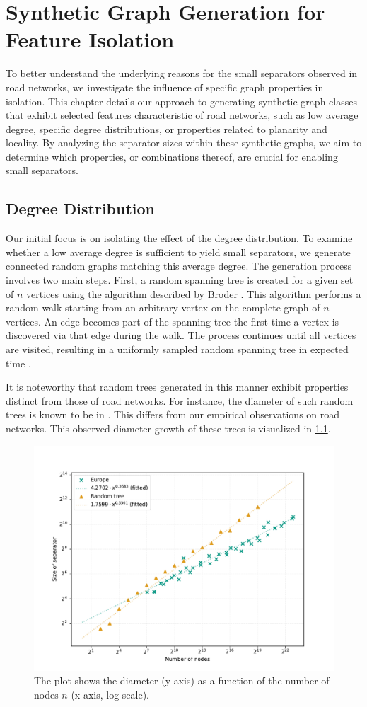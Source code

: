 \chapter{Synthetic Graph Generation for Feature Isolation}

To better understand the underlying reasons for the small separators observed in road networks, we investigate the influence of specific graph properties in isolation.
This chapter details our approach to generating synthetic graph classes that exhibit selected features characteristic of road networks, such as low average degree, specific degree distributions, or properties related to planarity and locality.
By analyzing the separator sizes within these synthetic graphs, we aim to determine which properties, or combinations thereof, are crucial for enabling small separators.

\section{Degree Distribution}

Our initial focus is on isolating the effect of the degree distribution.
To examine whether a low average degree is sufficient to yield small separators, we generate connected random graphs matching this average degree.
The generation process involves two main steps.
First, a random spanning tree is created for a given set of \(n\) vertices using the algorithm described by Broder \cite{broder_generating_1989}.
This algorithm performs a random walk starting from an arbitrary vertex on the complete graph of \(n\) vertices.
An edge becomes part of the spanning tree the first time a vertex is discovered via that edge during the walk.
The process continues until all vertices are visited, resulting in a uniformly sampled random spanning tree in expected time .

It is noteworthy that random trees generated in this manner exhibit properties distinct from those of road networks.
For instance, the diameter of such random trees is known to be in  \cite{chlamtac_tree-based_1987}.
This differs from our empirical observations on road networks.
This observed diameter growth of these trees is visualized in \cref{fig:diameter_karlsruhe}.

\begin{figure}[tbhp]
	\centering
	\includegraphics[width=0.6\linewidth]{graphics/diameters.pdf}
	\caption{The plot shows the diameter (y-axis) as a function of the number of nodes \(n\) (x-axis, log scale).}
	\label{fig:diameter_karlsruhe}
\end{figure}

